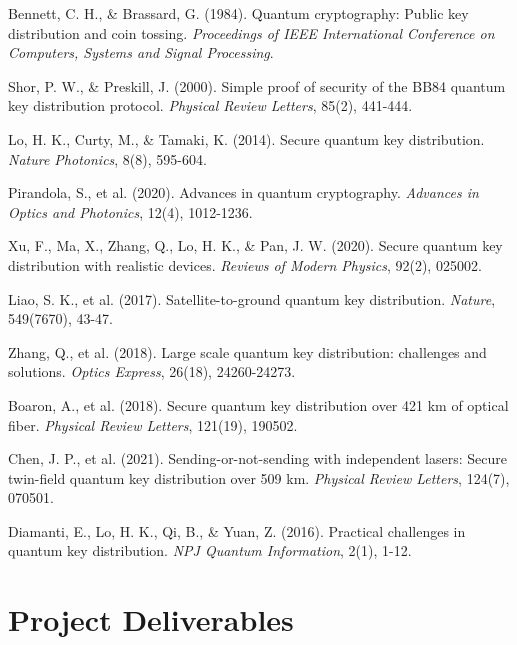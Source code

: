 \documentclass[12pt,a4paper]{article}
\begin{document}
\begin{thebibliography}{10}

Bennett, C. H., \& Brassard, G. (1984). Quantum cryptography: Public key distribution and coin tossing. \textit{Proceedings of IEEE International Conference on Computers, Systems and Signal Processing}.

Shor, P. W., \& Preskill, J. (2000). Simple proof of security of the BB84 quantum key distribution protocol. \textit{Physical Review Letters}, 85(2), 441-444.

Lo, H. K., Curty, M., \& Tamaki, K. (2014). Secure quantum key distribution. \textit{Nature Photonics}, 8(8), 595-604.

Pirandola, S., et al. (2020). Advances in quantum cryptography. \textit{Advances in Optics and Photonics}, 12(4), 1012-1236.

Xu, F., Ma, X., Zhang, Q., Lo, H. K., \& Pan, J. W. (2020). Secure quantum key distribution with realistic devices. \textit{Reviews of Modern Physics}, 92(2), 025002.

Liao, S. K., et al. (2017). Satellite-to-ground quantum key distribution. \textit{Nature}, 549(7670), 43-47.

Zhang, Q., et al. (2018). Large scale quantum key distribution: challenges and solutions. \textit{Optics Express}, 26(18), 24260-24273.

Boaron, A., et al. (2018). Secure quantum key distribution over 421 km of optical fiber. \textit{Physical Review Letters}, 121(19), 190502.

Chen, J. P., et al. (2021). Sending-or-not-sending with independent lasers: Secure twin-field quantum key distribution over 509 km. \textit{Physical Review Letters}, 124(7), 070501.

Diamanti, E., Lo, H. K., Qi, B., \& Yuan, Z. (2016). Practical challenges in quantum key distribution. \textit{NPJ Quantum Information}, 2(1), 1-12.

\end{thebibliography}

\appendix

\section{Project Deliverables}
\end{document}
